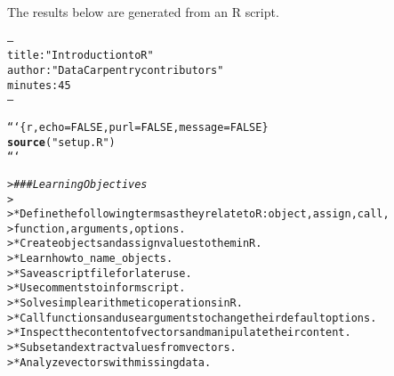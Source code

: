 \documentclass{article}\usepackage[]{graphicx}\usepackage[]{xcolor}
\makeatletter
\newcommand{\hlstr}[1]{\textcolor[rgb]{0.192,0.494,0.8}{#1}}%
\newcommand{\hlcom}[1]{\textcolor[rgb]{0.678,0.584,0.686}{\textit{#1}}}%
\newcommand{\hlkwd}[1]{\textcolor[rgb]{0.737,0.353,0.396}{\textbf{#1}}}%
\newenvironment{kframe}{%
 \def\at@end@of@kframe{}%
 \ifinner\ifhmode%
  \def\at@end@of@kframe{\end{minipage}}%
  \begin{minipage}{\columnwidth}%
 \fi\fi%
 \def\FrameCommand##1{\hskip\@totalleftmargin \hskip-\fboxsep
 \colorbox{shadecolor}{##1}\hskip-\fboxsep
     \hskip-\linewidth \hskip-\@totalleftmargin \hskip\columnwidth}%
 \MakeFramed {\advance\hsize-\width
   \@totalleftmargin\z@ \linewidth\hsize
   \@setminipage}}%
 {\par\unskip\endMakeFramed%
 \at@end@of@kframe}
\newenvironment{knitrout}{}{} %
\makeatother
\begin{document}
\title{\title{}}



\maketitle
The results below are generated from an R script.

\begin{knitrout}
\color{fgcolor}\begin{kframe}
\begin{alltt}
---
title: \hlstr{"Introduction to R"}
author: \hlstr{"Data Carpentry contributors"}
minutes: 45
---


```\{r, echo = FALSE, purl = FALSE, message = FALSE\}
\hlkwd{source}(\hlstr{"setup.R"})
```
\end{alltt}


{\ttfamily\noindent\bfseries\color{errorcolor}{\#\# Error: attempt to use zero-length variable name}}\end{kframe}
\end{knitrout}
\begin{knitrout}
\color{fgcolor}\begin{kframe}
\begin{alltt}

> \hlcom{### Learning Objectives}
>
> * Define the following terms as they relate to R: object, assign, call,
>   function, arguments, options.
> * Create objects and assign values to them  in R.
> * Learn how to _name_ objects.
> * Save a script file for later use.
> * Use comments to inform script.
> * Solve simple arithmetic operations in R.
> * Call functions and use arguments to change their default options.
> * Inspect the content of vectors and manipulate their content.
> * Subset and extract values from vectors.
> * Analyze vectors with missing data.
\end{alltt}


{\ttfamily\noindent\bfseries{}}\end{kframe}
\end{knitrout}
\end{document}
